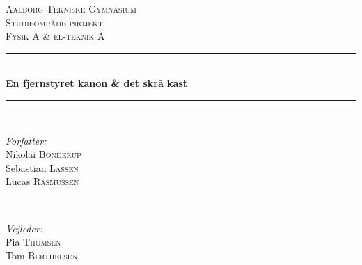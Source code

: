 


\begin{titlepage}

\newcommand{\HRule}{\rule{\linewidth}{0.5mm}} %

\center %
 

\textsc{\LARGE Aalborg Tekniske Gymnasium}\\[1.5cm] %
\textsc{\Large Studieområde-projekt}\\[0.5cm] %
\textsc{\large Fysik A \& el-teknik A}\\[0.5cm] %


\HRule \\[0.4cm]
{ \huge \bfseries En fjernstyret kanon \& det skrå kast  }\\[0.4cm] %
\HRule \\[1.5cm]
 

\begin{minipage}{0.4\textwidth}
\begin{flushleft} \large
\emph{Forfatter:}\\
Nikolai \textsc{Bonderup}\\ %
Sebastian \textsc{Lassen}\\
Lucas \textsc{Rasmussen}
\end{flushleft}
\end{minipage}
~
\begin{minipage}{0.4\textwidth}
\begin{flushright} \large
\emph{Vejleder:} \\
Pia \textsc{Thomsen} \\ %
Tom \textsc{Berthelsen}\\
\end{flushright}
\end{minipage}\\[2cm]


\end{titlepage}
